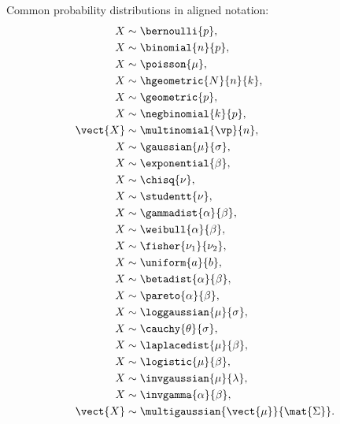 Common probability distributions in aligned notation:
\begin{align*}
  X        &\sim \bernoulli{p},                            \\
  X        &\sim \binomial{n}{p},                          \\
  X        &\sim \poisson{\mu},                            \\
  X        &\sim \hgeometric{N}{n}{k},                     \\
  X        &\sim \geometric{p},                            \\
  X        &\sim \negbinomial{k}{p},                       \\
  \vect{X} &\sim \multinomial{\vp}{n},                     \\
  X        &\sim \gaussian{\mu}{\sigma},                   \\
  X        &\sim \exponential{\beta},                      \\
  X        &\sim \chisq{\nu},                              \\
  X        &\sim \studentt{\nu},                           \\
  X        &\sim \gammadist{\alpha}{\beta},                \\
  X        &\sim \weibull{\alpha}{\beta},                  \\
  X        &\sim \fisher{\nu_1}{\nu_2},                    \\
  X        &\sim \uniform{a}{b},                           \\
  X        &\sim \betadist{\alpha}{\beta},                 \\
  X        &\sim \pareto{\alpha}{\beta},                   \\
  X        &\sim \loggaussian{\mu}{\sigma},                \\
  X        &\sim \cauchy{\theta}{\sigma},                  \\
  X        &\sim \laplacedist{\mu}{\beta},                 \\
  X        &\sim \logistic{\mu}{\beta},                    \\
  X        &\sim \invgaussian{\mu}{\lambda},               \\
  X        &\sim \invgamma{\alpha}{\beta},                 \\
  \vect{X} &\sim \multigaussian{\vect{\mu}}{\mat{\Sigma}}.
\end{align*}

